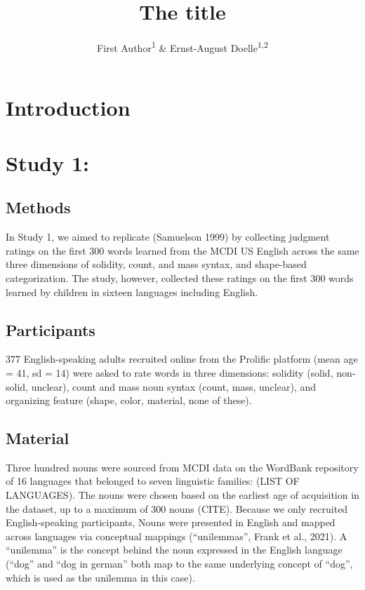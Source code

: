 \documentclass[
  english,
  man,floatsintext]{apa6}
\title{The title}
\author{First Author\textsuperscript{1} \& Ernst-August Doelle\textsuperscript{1,2}}
\date{}
\affiliation{\vspace{0.5cm}\textsuperscript{1} Wilhelm-Wundt-University\\\textsuperscript{2} Konstanz Business School}
\begin{document}
\maketitle

\section{Introduction}\label{introduction}

\section{Study 1:}\label{study-1}

\subsection{Methods}\label{methods}

In Study 1, we aimed to replicate (Samuelson 1999) by collecting judgment ratings on the first 300 words learned from the MCDI US English across the same three dimensions of solidity, count, and mass syntax, and shape-based categorization. The study, however, collected these ratings on the first 300 words learned by children in sixteen languages including English.

\subsection{Participants}\label{participants}

377 English-speaking adults recruited online from the Prolific platform (mean age = 41, sd = 14) were asked to rate words in three dimensions: solidity (solid, non-solid, unclear), count and mass noun syntax (count, mass, unclear), and organizing feature (shape, color, material, none of these).

\subsection{Material}\label{material}

Three hundred nouns were sourced from MCDI data on the WordBank repository of 16 languages that belonged to seven linguistic families: (LIST OF LANGUAGES). The nouns were chosen based on the earliest age of acquisition in the dataset, up to a maximum of 300 nouns (CITE). Because we only recruited English-speaking participants, Nouns were presented in English and mapped across languages via conceptual mappings (``unilemmas'', Frank et al., 2021). A ``unilemma'' is the concept behind the noun expressed in the English language (``dog'' and ``dog in german'' both map to the same underlying concept of ``dog'', which is used as the unilemma in this case).
\end{document}
